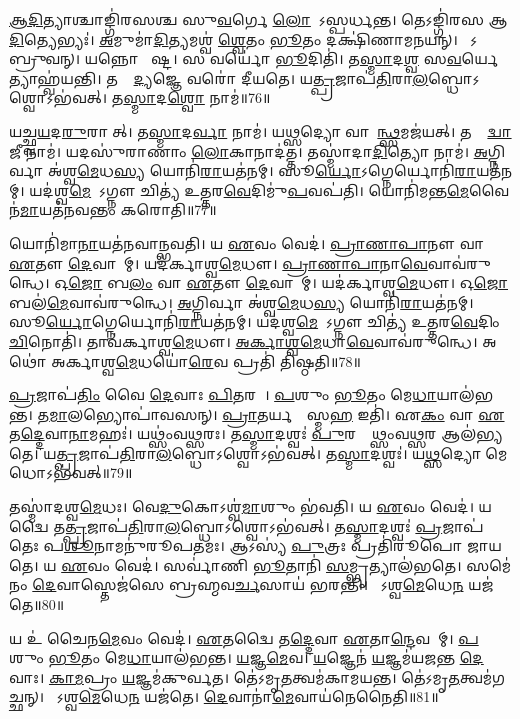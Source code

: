 \ul{𑌆}\ul{𑌦𑌿}𑌤𑍍𑌯𑌾𑌶𑍍𑌚𑌾𑌙𑍍𑌗𑌿॑𑌰𑌸𑌶𑍍𑌚 𑌸𑍁\ul{𑌵}𑌰𑍍𑌗𑍇 \ul{𑌲𑍋}𑌕𑍇᳚\-𑌽𑌸𑍍𑌪𑌰𑍍𑌧𑌨𑍍𑌤।
𑌤𑍇𑌽𑌙𑍍𑌗𑌿॑𑌰𑌸 𑌆\ul{𑌦𑌿}𑌤𑍍𑌯𑍇𑌭𑍍𑌯𑌃॑।
\ul{𑌅}𑌮𑍁𑌮𑌾॑\ul{𑌦𑌿}𑌤𑍍𑌯𑌮𑌶𑍍𑌵॑ \ul{𑌶𑍍𑌵𑍇}𑌤𑌂 \ul{𑌭𑍂}𑌤𑌂 𑌦𑌕𑍍𑌷𑌿॑𑌣𑌾𑌮𑌨𑌯𑌨𑍍।
𑌤𑍇᳚𑌽𑌬𑍍𑌰𑍁𑌵𑌨𑍍।
𑌯𑌨𑍍𑌨𑍋 𑌨𑍇᳚𑌷𑍍𑌟।
𑌸 𑌵𑌰𑍍𑌯𑍋॑ \ul{𑌭𑍂}𑌦𑌿𑌤𑌿॑।
𑌤\ul{𑌸𑍍𑌮𑌾}𑌦\ul{𑌶𑍍𑌵}\ul{} 𑌸\ul{𑌵}𑌰𑍍𑌯𑍇𑌤𑍍𑌯𑌾𑌹𑍍𑌵॑𑌯𑌨𑍍𑌤𑌿।
𑌤𑌸𑍍𑌮𑌾᳚\ul{𑌦𑍍𑌯}𑌜𑍍𑌞𑍇 𑌵𑌰𑍋॑ 𑌦𑍀𑌯𑌤𑍇।
𑌯\ul{𑌤𑍍𑌪𑍍𑌰}𑌜𑌾𑌪॑\ul{𑌤𑌿}𑌰𑌾\-\ul{𑌲}𑌬𑍍𑌧𑍋\-𑌽𑌶𑍍𑌵𑍋\-𑌽𑌭॑𑌵𑌤𑍍।
𑌤\ul{𑌸𑍍𑌮𑌾}𑌦\ul{𑌶𑍍𑌵𑍋} 𑌨𑌾𑌮॑॥76॥

𑌯𑌚𑍍𑌛𑍍𑌵\ul{𑌯}𑌦\ul{𑌰𑍁}𑌰𑌾𑌸𑍀᳚𑌤𑍍।
𑌤\ul{𑌸𑍍𑌮𑌾}𑌦\ul{𑌰𑍍𑌵𑌾} 𑌨𑌾𑌮॑।
𑌯\ul{𑌥𑍍𑌸}𑌦𑍍𑌯𑍋 𑌵𑌾𑌜𑌾᳚\ul{𑌨𑍍𑌥𑍍𑌸}𑌮\-𑌜॑𑌯𑌤𑍍।
𑌤𑌸𑍍𑌮𑌾᳚\ul{𑌦𑍍𑌵𑌾}𑌜𑍀 𑌨𑌾𑌮॑।
𑌯𑌦𑌸𑍁॑𑌰𑌾𑌣𑌾𑌂 \ul{𑌲𑍋}𑌕𑌾𑌨𑌾𑌦॑𑌤𑍍𑌤।
𑌤𑌸𑍍𑌮𑌾॑𑌦𑌾\ul{𑌦𑌿}𑌤𑍍𑌯𑍋 𑌨𑌾𑌮॑।
\ul{𑌅}𑌗𑍍𑌨𑌿𑌰𑍍𑌵𑌾 𑌅॑𑌶𑍍𑌵\ul{𑌮𑍇}𑌧\ul{𑌸𑍍𑌯} 𑌯𑍋𑌨𑌿॑\ul{𑌰𑌾}\-𑌯𑌤॑𑌨𑌮𑍍।
𑌸𑍂\ul{𑌰𑍍𑌯𑍋}\-𑌽𑌗𑍍𑌨𑍇𑌰𑍍𑌯𑍋𑌨𑌿॑\ul{𑌰𑌾}\-𑌯𑌤॑𑌨𑌮𑍍।
𑌯𑌦॑𑌶𑍍𑌵\ul{𑌮𑍇}𑌧𑍇᳚\-𑌽𑌗𑍍𑌨𑍗 𑌚𑌿𑌤𑍍𑌯॑ 𑌉𑌤𑍍𑌤𑌰\ul{𑌵𑍇}𑌦𑌿𑌮𑍁॑\ul{𑌪}𑌵𑌪॑𑌤𑌿।
𑌯𑍋𑌨𑌿॑𑌮𑌨𑍍𑌤\ul{𑌮𑍇}𑌵𑍈𑌨॑\ul{𑌮𑌾}𑌯𑌤॑𑌨𑌵𑌨𑍍𑌤𑌂 𑌕𑌰𑍋𑌤𑌿॥77॥

𑌯𑍋𑌨𑌿॑𑌮𑌾\ul{𑌨𑌾}𑌯𑌤॑𑌨𑌵𑌾𑌨𑍍𑌭𑌵𑌤𑌿।
𑌯 \ul{𑌏}𑌵𑌂 𑌵𑍇𑌦॑।
\ul{𑌪𑍍𑌰𑌾}\ul{𑌣𑌾}\ul{𑌪𑌾}𑌨𑍗 𑌵𑌾 \ul{𑌏}𑌤𑍗 \ul{𑌦𑍇}𑌵𑌾𑌨𑌾᳚𑌮𑍍।
𑌯𑌦॑𑌰𑍍𑌕𑌾𑌶𑍍𑌵\ul{𑌮𑍇}𑌧𑍗।
\ul{𑌪𑍍𑌰𑌾}\ul{𑌣𑌾}\ul{𑌪𑌾}𑌨𑌾\ul{𑌵𑍇}𑌵𑌾𑌵॑𑌰𑍁𑌨𑍍𑌧𑍇।
𑌓\ul{𑌜𑍋} 𑌬\ul{𑌲𑌂} 𑌵𑌾 \ul{𑌏}𑌤𑍗 \ul{𑌦𑍇}𑌵𑌾𑌨𑌾᳚𑌮𑍍।
𑌯𑌦॑𑌰𑍍𑌕𑌾𑌶𑍍𑌵\ul{𑌮𑍇}𑌧𑍗।
𑌓\ul{𑌜𑍋} 𑌬𑌲॑\ul{𑌮𑍇}𑌵𑌾𑌵॑𑌰𑍁𑌨𑍍𑌧𑍇।
\ul{𑌅}𑌗𑍍𑌨𑌿𑌰𑍍𑌵𑌾 𑌅॑𑌶𑍍𑌵\ul{𑌮𑍇}𑌧\ul{𑌸𑍍𑌯} 𑌯𑍋𑌨𑌿॑\ul{𑌰𑌾}𑌯𑌤॑𑌨𑌮𑍍।
𑌸𑍂\ul{𑌰𑍍𑌯𑍋}𑌗𑍍𑌨𑍇𑌰𑍍𑌯𑍋𑌨𑌿॑\ul{𑌰𑌾}𑌯𑌤॑𑌨𑌮𑍍।
𑌯𑌦॑𑌶𑍍𑌵\ul{𑌮𑍇}𑌧𑍇᳚\-𑌽𑌗𑍍𑌨𑍗 𑌚𑌿𑌤𑍍𑌯॑ 𑌉𑌤𑍍𑌤𑌰\ul{𑌵𑍇}𑌦𑌿𑌂 \ul{𑌚𑌿}𑌨𑍋𑌤𑌿॑।
𑌤𑌾𑌵॑𑌰𑍍𑌕𑌾𑌶𑍍𑌵\ul{𑌮𑍇}𑌧𑍗।
\ul{𑌅}\ul{𑌰𑍍𑌕𑌾}\ul{𑌶𑍍𑌵}\ul{𑌮𑍇}𑌧𑌾\ul{𑌵𑍇}𑌵𑌾𑌵॑𑌰𑍁𑌨𑍍𑌧𑍇।
𑌅𑌥𑍋॑ 𑌅𑌰𑍍𑌕𑌾𑌶𑍍𑌵\ul{𑌮𑍇}𑌧𑌯𑍋॑\ul{𑌰𑍇}𑌵 𑌪𑍍𑌰𑌤𑌿॑ 𑌤𑌿𑌷𑍍𑌠𑌤𑌿॥78॥\anuvakamend[𑌨𑌾𑌮॑ 𑌕𑌰𑍋\ul{𑌤𑌿} 𑌸𑍂\ul{𑌰𑍍𑌯𑍋}\-𑌽𑌗𑍍𑌨𑍇𑌰𑍍𑌯𑍋𑌨𑌿॑\ul{𑌰𑌾}𑌯𑌤॑𑌨\ul{𑌞𑍍𑌚}𑌤𑍍𑌵𑌾𑌰𑌿॑ 𑌚]

\ul{𑌪𑍍𑌰}𑌜𑌾𑌪॑\ul{𑌤𑌿𑌂} 𑌵𑍈 \ul{𑌦𑍇}𑌵𑌾𑌃 \ul{𑌪𑌿}𑌤𑌰𑌮𑍍᳚।
\ul{𑌪}𑌶𑍁𑌂 \ul{𑌭𑍂}𑌤𑌂 𑌮𑍇\ul{𑌧𑌾}𑌯𑌾𑌲॑𑌭𑌨𑍍𑌤।
𑌤\ul{𑌮𑌾}𑌲𑌭𑍍𑌯𑍋𑌪𑌾॑𑌵𑌸𑌨𑍍।
\ul{𑌪𑍍𑌰𑌾}𑌤𑌰𑍍𑌯𑌷𑍍𑌟𑌾᳚𑌸𑍍𑌮\ul{𑌹} 𑌇𑌤𑌿॑।
𑌏\ul{𑌕𑌂} 𑌵𑌾 \ul{𑌏}𑌤\ul{𑌦𑍍𑌦𑍇}𑌵𑌾\ul{𑌨𑌾}𑌮𑌹𑌃॑।
𑌯𑌥𑍍𑌸𑌂॑𑌵\ul{𑌥𑍍𑌸}𑌰𑌃।
𑌤\ul{𑌸𑍍𑌮𑌾}𑌦𑌶𑍍𑌵𑌃॑ \ul{𑌪𑍁}𑌰𑌸𑍍𑌤𑌾᳚𑌥𑍍𑌸𑌂𑌵\ul{𑌥𑍍𑌸}𑌰 𑌆𑌲॑𑌭𑍍𑌯𑌤𑍇।
𑌯\ul{𑌤𑍍𑌪𑍍𑌰}𑌜𑌾𑌪॑\ul{𑌤𑌿}𑌰𑌾\ul{𑌲}𑌬𑍍𑌧𑍋\-𑌽𑌶𑍍𑌵𑍋\-𑌽𑌭॑𑌵𑌤𑍍।
𑌤\ul{𑌸𑍍𑌮𑌾}𑌦𑌶𑍍𑌵𑌃॑।
𑌯\ul{𑌥𑍍𑌸}𑌦𑍍𑌯𑍋 𑌮𑍇𑌧𑍋\-𑌽𑌭॑𑌵𑌤𑍍॥79॥

𑌤𑌸𑍍𑌮𑌾॑𑌦𑌶𑍍𑌵\ul{𑌮𑍇}𑌧𑌃।
𑌵𑍇\ul{𑌦𑍁}𑌕𑍋\-𑌽𑌶𑍍𑌵॑\ul{𑌮𑌾}𑌶𑍁𑌂 𑌭॑𑌵𑌤𑌿।
𑌯 \ul{𑌏}𑌵𑌂 𑌵𑍇𑌦॑।
𑌯𑌦𑍍𑌵𑍈 𑌤\ul{𑌤𑍍𑌪𑍍𑌰}𑌜𑌾𑌪॑\ul{𑌤𑌿}𑌰𑌾\ul{𑌲}𑌬𑍍𑌧𑍋\-𑌽𑌶𑍍𑌵𑍋\-𑌽𑌭॑𑌵𑌤𑍍।
𑌤\ul{𑌸𑍍𑌮𑌾}𑌦𑌶𑍍𑌵𑌃॑ \ul{𑌪𑍍𑌰}𑌜𑌾𑌪॑𑌤𑍇𑌃 𑌪\ul{𑌶𑍂}𑌨𑌾𑌮𑌨𑍁॑𑌰𑍂𑌪𑌤𑌮𑌃।
𑌆𑌽𑌸𑍍𑌯॑ \ul{𑌪𑍁}𑌤𑍍𑌰𑌃 𑌪𑍍𑌰𑌤𑌿॑\-𑌰𑍂𑌪𑍋 𑌜𑌾𑌯𑌤𑍇।
𑌯 \ul{𑌏}𑌵𑌂 𑌵𑍇𑌦॑।
𑌸𑌰𑍍𑌵𑌾॑𑌣𑌿 \ul{𑌭𑍂}𑌤𑌾𑌨𑌿॑ \ul{𑌸}𑌮𑍍𑌭𑍃𑌤𑍍𑌯𑌾𑌲॑𑌭𑌤𑍇।
𑌸𑌮𑍇॑𑌨𑌂 \ul{𑌦𑍇}𑌵𑌾𑌸𑍍𑌤𑍇𑌜॑𑌸𑍇 𑌬𑍍𑌰𑌹𑍍𑌮𑌵\ul{𑌰𑍍𑌚}𑌸𑌾𑌯॑ 𑌭𑌰𑌨𑍍𑌤𑌿।
𑌯𑍋᳚𑌽𑌶𑍍𑌵\ul{𑌮𑍇}𑌧𑍇\ul{𑌨} 𑌯𑌜॑𑌤𑍇॥80॥

𑌯 𑌉॑ 𑌚𑍈𑌨\ul{𑌮𑍇}𑌵𑌂 𑌵𑍇𑌦॑।
\ul{𑌏}𑌤𑌦𑍍𑌵𑍈 𑌤\ul{𑌦𑍍𑌦𑍇}𑌵𑌾 \ul{𑌏}𑌤𑌾\ul{𑌨𑍍𑌦𑍇}𑌵𑌤𑌾᳚𑌮𑍍।
\ul{𑌪}𑌶𑍁𑌂 \ul{𑌭𑍂}𑌤𑌂 𑌮𑍇\ul{𑌧𑌾}𑌯𑌾𑌲॑𑌭𑌨𑍍𑌤।
\ul{𑌯}𑌜𑍍𑌞\ul{𑌮𑍇}𑌵।
\ul{𑌯}𑌜𑍍𑌞𑍇𑌨॑ \ul{𑌯}𑌜𑍍𑌞𑌮॑𑌯𑌜𑌨𑍍𑌤 \ul{𑌦𑍇}𑌵𑌾𑌃।
\ul{𑌕𑌾}\ul{𑌮}𑌪𑍍𑌰𑌂 \ul{𑌯}𑌜𑍍𑌞𑌮॑𑌕𑍁𑌰𑍍𑌵𑌤।
𑌤𑍇॑𑌽𑌮𑍃\ul{𑌤}𑌤𑍍𑌵𑌮॑𑌕𑌾𑌮𑌯𑌨𑍍𑌤।
𑌤𑍇॑𑌽𑌮𑍃\ul{𑌤}𑌤𑍍𑌵𑌮॑𑌗𑌚𑍍𑌛𑌨𑍍।
𑌯𑍋᳚𑌽𑌶𑍍𑌵\ul{𑌮𑍇}𑌧𑍇\ul{𑌨} 𑌯𑌜॑𑌤𑍇।
\ul{𑌦𑍇}𑌵𑌾𑌨𑌾॑\ul{𑌮𑍇}𑌵𑌾𑌯॑𑌨𑍇𑌨𑍈𑌤𑌿॥81॥

